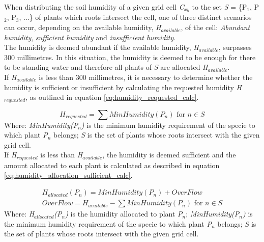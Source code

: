 When distributing the soil humidity of a given grid cell \textit{C$_{xy}$} to the set \textit{S} = \{P$_{1}$, P$_{2}$, P$_{3}$, ...\} of plants which roots intersect the cell, one of three distinct scenarios can occur, depending on the available humidity, \textit{H$_{available}$}, of the cell: \textit{Abundant humidity}, \textit{sufficient humidity} and \textit{insufficient humidity}.\\

The humidity is deemed abundant if the available humidity, \textit{H$_{available}$}, surpasses 300 millimetres. In this situation, the humidity is deemed to be enough for there to be standing water and therefore all plants of \textit{S} are allocated \textit{H$_{available}$}. \\

If \textit{H$_{available}$} is less than 300 millimetres, it is necessary to determine whether the humidity is sufficient or insufficient by calculating the requested humidity \textit{H$_{requested}$}, as outlined in equation \ref{eq:humidity_requested_calc}.

\begin{equation}
H_{requested} = \sum MinHumidity(P_{n}) \text{ for } n \in S
\label{eq:humidity_requested_calc}
\end{equation}
Where: \textit{MinHumidity(P$_{n}$)} is the minimum humidity requirement of the specie to which plant \textit{P$_{n}$} belongs; \textit{S} is the set of plants whose roots intersect with the given grid cell.\\

If \textit{H$_{requested}$} is less than \textit{H$_{available}$}, the humidity is deemed sufficient and the amount allocated to each plant is calculated as described in equation \ref{eq:humidity_allocation_sufficient_calc}.

\begin{equation}
\begin{split}
H_{allocated}(P_{n}) = MinHumidity(P_{n}) + OverFlow \\
OverFlow = H_{available} - \sum MinHumidity(P_{n}) \text{ for } n \in S
\end{split}
\label{eq:humidity_allocation_sufficient_calc}
\end{equation}
Where: \textit{H$_{allocated}$(P$_{n}$)} is the humidity allocated to plant \textit{P$_{n}$}; \textit{MinHumidity(P$_{n}$)} is the minimum humidity requirement of the specie to which plant \textit{P$_{n}$} belongs; \textit{S} is the set of plants whose roots intersect with the given grid cell.\\

